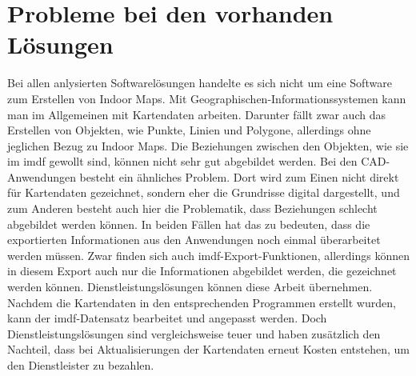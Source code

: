 \section{Probleme bei den vorhanden Lösungen}
Bei allen anlysierten Softwarelösungen handelte es sich nicht um eine Software zum Erstellen von Indoor Maps.
Mit Geographischen-Informationssystemen kann man im Allgemeinen mit Kartendaten arbeiten.
Darunter fällt zwar auch das Erstellen von Objekten, wie Punkte, Linien und Polygone, allerdings ohne jeglichen Bezug zu Indoor Maps.
Die Beziehungen zwischen den Objekten, wie sie im \acl{imdf} gewollt sind, können nicht sehr gut abgebildet werden.
Bei den CAD-Anwendungen besteht ein ähnliches Problem.
Dort wird zum Einen nicht direkt für Kartendaten gezeichnet, sondern eher die Grundrisse digital dargestellt, und zum Anderen besteht auch hier die Problematik, dass Beziehungen schlecht abgebildet werden können.\pbreak%
%
In beiden Fällen hat das zu bedeuten, dass die exportierten Informationen aus den Anwendungen noch einmal überarbeitet werden müssen.
Zwar finden sich auch \ac{imdf}-Export-Funktionen, allerdings können in diesem Export auch nur die Informationen abgebildet werden, die gezeichnet werden können.\pbreak%
%
Dienstleistungslösungen können diese Arbeit übernehmen.
Nachdem die Kartendaten in den entsprechenden Programmen erstellt wurden, kann der \ac{imdf}-Datensatz bearbeitet und angepasst werden.
Doch Dienstleistungslösungen sind vergleichsweise teuer und haben zusätzlich den Nachteil, dass bei Aktualisierungen der Kartendaten erneut Kosten entstehen, um den Dienstleister zu bezahlen.
